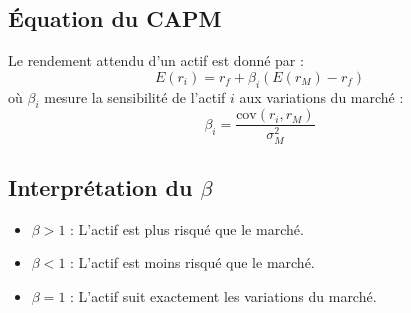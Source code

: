 \documentclass[a4paper, 12pt]{report}
\begin{document}
\subsection{Équation du CAPM}
Le rendement attendu d’un actif est donné par :
\[
E(r_i) = r_f + \beta_i (E(r_M) - r_f)
\]
où $\beta_i$ mesure la sensibilité de l’actif $i$ aux variations du marché :
\[
\beta_i = \frac{\text{cov}(r_i, r_M)}{\sigma_M^2}
\]

\subsection{Interprétation du $\beta$}
\begin{itemize}
	\item $\beta > 1$ : L’actif est plus risqué que le marché.
	\item $\beta < 1$ : L’actif est moins risqué que le marché.
	\item $\beta = 1$ : L’actif suit exactement les variations du marché.
\end{itemize}
\end{document}
